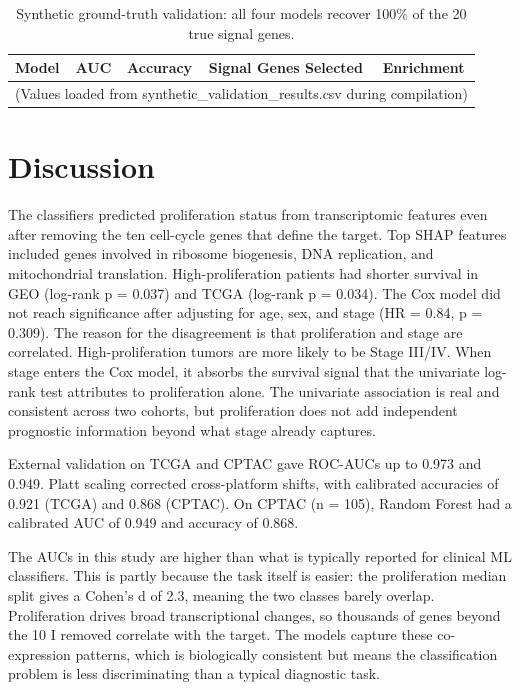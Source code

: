 \documentclass[12pt]{article}
\begin{document}
\begin{table}[H]
\centering
\caption{Synthetic ground-truth validation: all four models recover 100\% of the 20 true signal genes.}
\begin{tabular}{lllll}
\toprule
Model & AUC & Accuracy & Signal Genes Selected & Enrichment \\
\midrule
\multicolumn{5}{l}{(Values loaded from synthetic\_validation\_results.csv during compilation)} \\
\bottomrule
\end{tabular}
\end{table}

\section{Discussion}

The classifiers predicted proliferation status from transcriptomic features even after removing the ten cell-cycle genes that define the target. Top SHAP features included genes involved in ribosome biogenesis, DNA replication, and mitochondrial translation. High-proliferation patients had shorter survival in GEO (log-rank p = 0.037) and TCGA (log-rank p = 0.034). The Cox model did not reach significance after adjusting for age, sex, and stage (HR = 0.84, p = 0.309). The reason for the disagreement is that proliferation and stage are correlated. High-proliferation tumors are more likely to be Stage III/IV. When stage enters the Cox model, it absorbs the survival signal that the univariate log-rank test attributes to proliferation alone. The univariate association is real and consistent across two cohorts, but proliferation does not add independent prognostic information beyond what stage already captures.

External validation on TCGA and CPTAC gave ROC-AUCs up to 0.973 and 0.949. Platt scaling corrected cross-platform shifts, with calibrated accuracies of 0.921 (TCGA) and 0.868 (CPTAC). On CPTAC (n = 105), Random Forest had a calibrated AUC of 0.949 and accuracy of 0.868.

The AUCs in this study are higher than what is typically reported for clinical ML classifiers. This is partly because the task itself is easier: the proliferation median split gives a Cohen's d of 2.3, meaning the two classes barely overlap. Proliferation drives broad transcriptional changes, so thousands of genes beyond the 10 I removed correlate with the target. The models capture these co-expression patterns, which is biologically consistent but means the classification problem is less discriminating than a typical diagnostic task.
\end{document}
